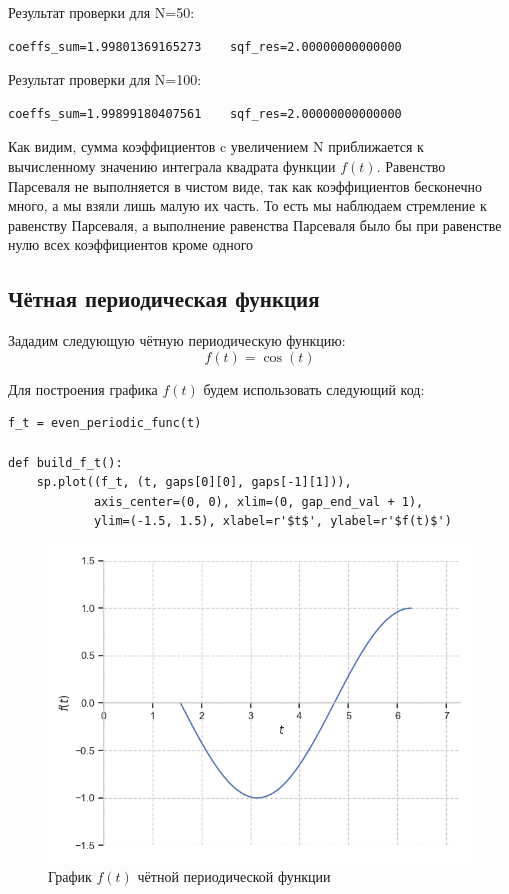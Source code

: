 \documentclass[a4paper, 16pt]{article}
\begin{document}
\noindent Результат проверки для N=50:
\begin{lstlisting}
coeffs_sum=1.99801369165273    sqf_res=2.00000000000000
\end{lstlisting}


\noindent Результат проверки для N=100:
\begin{lstlisting}
coeffs_sum=1.99899180407561    sqf_res=2.00000000000000
\end{lstlisting}


\noindent Как видим, сумма коэффициентов c увеличением N приближается к
вычисленному значению интеграла квадрата функции $f(t)$. Равенство Парсеваля
не выполняется в чистом виде, так как коэффициентов бесконечно много, а мы взяли
лишь малую их часть. То есть мы наблюдаем стремление к равенству Парсеваля, а 
выполнение равенства Парсеваля было бы при равенстве нулю всех коэффициентов кроме одного


\newpage
\subsection{Чётная периодическая функция}
Зададим следующую чётную периодическую функцию:
$$f(t)=\cos(t)$$


\noindent Для построения графика $f(t)$ будем использовать следующий код:
\begin{lstlisting}[belowskip=-3mm]
f_t = even_periodic_func(t)

def build_f_t():
    sp.plot((f_t, (t, gaps[0][0], gaps[-1][1])), 
            axis_center=(0, 0), xlim=(0, gap_end_val + 1), 
            ylim=(-1.5, 1.5), xlabel=r'$t$', ylabel=r'$f(t)$')
\end{lstlisting}
\begin{figure}[!htb]
    \centering
    \includegraphics[scale=0.8]{even_f(t).png}
    \captionsetup{skip=0pt}
    \caption{График $f(t)$ чётной периодической функции}
    \label{Рис:12}
\end{figure}
\end{document}
